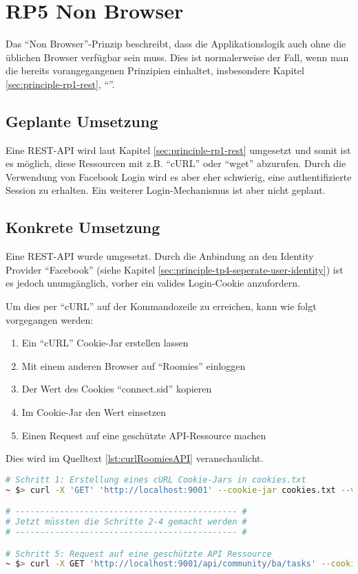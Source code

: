 \section{RP5 Non Browser}
\label{sec:principle-rp5-non-browser}

Das ``Non Browser''-Prinzip beschreibt, dass die Applikationslogik auch ohne die üblichen Browser verfügbar sein muss. Dies ist normalerweise der Fall, wenn man die bereits vorangegangenen Prinzipien einhaltet, insbesondere Kapitel \ref{sec:principle-rp1-rest}, ``''.

\subsection*{Geplante Umsetzung}
Eine REST-API wird laut Kapitel \ref{sec:principle-rp1-rest} umgesetzt und somit ist es möglich, diese Ressourcen mit z.B. ``cURL'' \cite{curl} oder ``wget'' \cite{wget} abzurufen.
Durch die Verwendung von Facebook Login wird es aber eher schwierig, eine authentifizierte Session zu erhalten. Ein weiterer Login-Mechanismus ist aber nicht geplant.

\subsection*{Konkrete Umsetzung}
Eine REST-API wurde umgesetzt. Durch die Anbindung an den Identity Provider ``Facebook'' (siehe Kapitel \ref{sec:principle-tp4-seperate-user-identity}) ist es jedoch unumgänglich, vorher ein valides Login-Cookie anzufordern.

Um dies per ``cURL'' auf der Kommandozeile zu erreichen, kann wie folgt vorgegangen werden:
\begin{enumerate}
	\item Ein ``cURL'' Cookie-Jar erstellen lassen
	\item Mit einem anderen Browser auf ``Roomies'' einloggen
	\item Der Wert des Cookies ``connect.sid'' kopieren
	\item Im Cookie-Jar den Wert einsetzen
	\item Einen Request auf eine geschützte API-Ressource machen
\end{enumerate}

Dies wird im Quelltext \ref{lst:curlRoomiesAPI} veranschaulicht.

\begin{lstlisting}[language=Bash, caption=cURL Request auf Roomies, label=lst:curlRoomiesAPI]
# Schritt 1: Erstellung eines cURL Cookie-Jars in cookies.txt
~ $> curl -X 'GET' 'http://localhost:9001' --cookie-jar cookies.txt --verbose --location

# --------------------------------------------- #
# Jetzt müssten die Schritte 2-4 gemacht werden #
# --------------------------------------------- #

# Schritt 5: Request auf eine geschützte API Ressource
~ $> curl -X GET 'http://localhost:9001/api/community/ba/tasks' --cookie cookies.txt  --verbose --location
\end{lstlisting}

